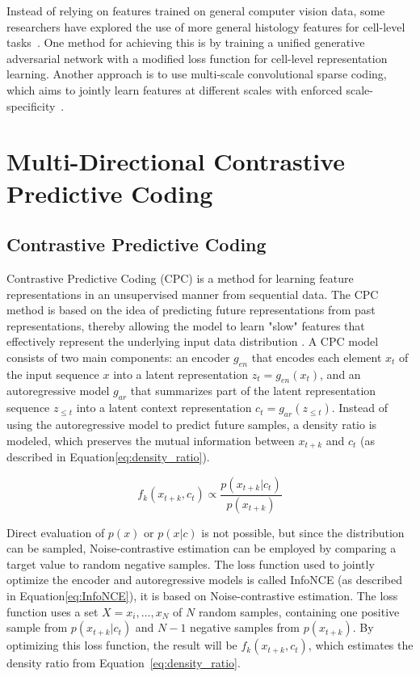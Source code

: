 Instead of relying on features trained on general computer vision data, some researchers have explored the use of more general histology features for cell-level tasks~\citep{hu2018unsupervised}. One method for achieving this is by training a unified generative adversarial network with a modified loss function for cell-level representation learning. Another approach is to use multi-scale convolutional sparse coding, which aims to jointly learn features at different scales with enforced scale-specificity~\citep{chang2017unsupervised}.



\section{Multi-Directional Contrastive Predictive Coding}
\label{sec:unsupervised_multi_directional_cpc}
\subsection{Contrastive Predictive Coding}
\label{subsec:unsupervised_cpc}
Contrastive Predictive Coding (CPC) is a method for learning feature representations in an unsupervised manner from sequential data. The CPC method is based on the idea of predicting future representations from past representations, thereby allowing the model to learn "slow" features that effectively represent the underlying input data distribution \citep{henaff2019data,oord2018representation}. A CPC model consists of two main components: an encoder $g_{en}$ that encodes each element $x_t$ of the input sequence $x$ into a latent representation $z_t = g_{en}(x_t)$, and an autoregressive model $g_{ar}$ that summarizes part of the latent representation sequence $z_{\le t}$ into a latent context representation $c_t = g_{ar}(z_{\le t})$. Instead of using the autoregressive model to predict future samples, a density ratio is modeled, which preserves the mutual information between $x_{t+k}$ and $c_t$ (as described in Equation\ref{eq:density_ratio}).

\begin{equation}
	f_k(x_{t+k}, c_t) \propto \frac{p(x_{t+k}|c_t)}{p(x_{t+k})}
	\label{eq:density_ratio}
\end{equation}

Direct evaluation of $p(x)$ or $p(x|c)$ is not possible, but since the distribution can be sampled, Noise-contrastive estimation \citep{gutmann2010noise} can be employed by comparing a target value to random negative samples. The loss function used to jointly optimize the encoder and autoregressive models is called InfoNCE (as described in Equation\ref{eq:InfoNCE}), it is based on Noise-contrastive estimation. The loss function uses a set $X={x_i,…,x_N}$ of $N$ random samples, containing one positive sample from $p(x_{t+k}|c_t)$ and $N-1$ negative samples from $p(x_{t+k})$. By optimizing this loss function, the result will be $f_k(x_{t+k}, c_t)$, which estimates the density ratio from Equation~\ref{eq:density_ratio}.

